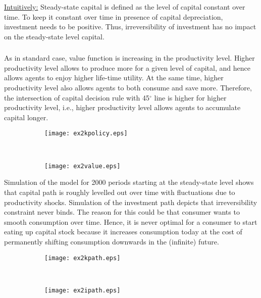 \documentclass[]{article}
\begin{document}
\underline{Intuitively:}
Steady-state capital is defined as the level of capital constant over time. To keep it constant over time in presence of capital depreciation, investment needs to be positive. Thus, irreversibility of investment has no impact on the steady-state level capital.

\subsubsection{}

As in standard case, value function is increasing in the productivity level. Higher productivity level allows to produce more for a given level of capital, and hence allows agents to enjoy higher life-time utility. At the same time, higher productivity level also allows agents to both consume and save more. Therefore, the intersection of capital decision rule with 45$^\circ$ line is higher for higher productivity level, i.e., higher productivity level allows agents to accumulate capital longer.

\begin{figure}[h]
	\centering
	\begin{subfigure}{0.45\textwidth}
		\centering
		\texttt{[image: ex2kpolicy.eps]}
	\end{subfigure} ~
	\begin{subfigure}{0.45\textwidth}
		\centering
		\texttt{[image: ex2value.eps]}
	\end{subfigure}
\end{figure}

Simulation of the model for 2000 periods starting at the steady-state level shows that capital path is roughly levelled out over time with fluctuations due to productivity shocks. Simulation of the investment path depicts that irreversibility constraint never binds. The reason for this could be that consumer wants to smooth consumption over time. Hence, it is never optimal for a consumer to start eating up capital stock because it increases consumption today at the cost of permanently shifting consumption downwards in the (infinite) future. 

\begin{figure}[h]
	\centering
	\begin{subfigure}{0.45\textwidth}
		\centering
		\texttt{[image: ex2kpath.eps]}
	\end{subfigure} ~
	\begin{subfigure}{0.45\textwidth}
		\centering
		\texttt{[image: ex2ipath.eps]}
	\end{subfigure}
\end{figure}
\end{document}

